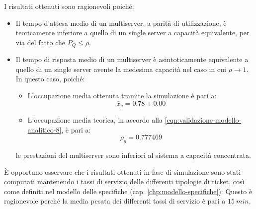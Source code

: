 I risultati ottenuti sono ragionevoli poiché:
\begin{itemize}
\item Il tempo d'attesa medio di un multiserver, a parità di utilizzazione, è teoricamente inferiore a quello di un single server a capacità equivalente, per via del fatto che $P_Q \leq \rho$.
\item Il tempo di risposta medio di un multiserver è asintoticamente equivalente a quello di un single server avente la medesima capacità nel caso in cui $\rho\to 1$. In questo caso, poiché:
\begin{itemize}
\item L'occupazione media ottenuta tramite la simulazione è pari a:
\begin{equation}
\bar{x}_g = 0.78 \pm 0.00
\end{equation}
\item L'occupazione media teorica, in accordo alla \ref{eqn:validazione-modello-analitico-8}, è pari a:
\begin{equation}
\rho_g = 0.777469
\end{equation}
\end{itemize}
le prestazioni del multiserver sono inferiori al sistema a capacità concentrata.
\end{itemize}

È opportuno osservare che i risultati ottenuti in fase di simulazione sono stati computati mantenendo i tassi di servizio delle differenti tipologie di ticket, così come definiti nel modello delle specifiche (cap. \ref{chp:modello-specifiche}). Questo è ragionevole perché la media pesata dei differenti tassi di servizio è pari a $15\ min$.
